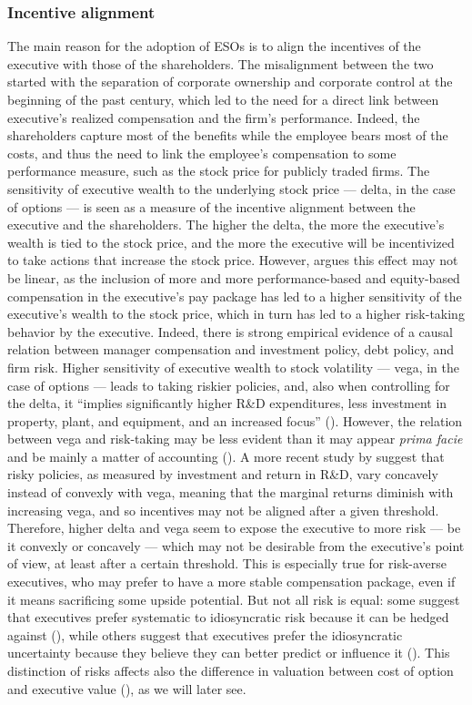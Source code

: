 \subsubsection{Incentive alignment} 
    The main reason for the adoption of ESOs is to align the incentives of the executive with those of the shareholders. The misalignment between the two started with the separation of corporate ownership and corporate control at the beginning of the past century, which led to the need for a direct link between executive's realized compensation and the firm's performance. Indeed, the shareholders capture most of the benefits while the employee bears most of the costs, and thus the need to link the employee's compensation to some performance measure, such as the stock price for publicly traded firms. 
    The sensitivity of executive wealth to the underlying stock price --- delta, in the case of options --- is seen as a measure of the incentive alignment between the executive and the shareholders. The higher the delta, the more the executive's wealth is tied to the stock price, and the more the executive will be incentivized to take actions that increase the stock price. However, \cite{coles2006managerial} argues this effect may not be linear, as the inclusion of more and more performance-based and equity-based compensation in the executive's pay package has led to a higher sensitivity of the executive's wealth to the stock price, which in turn has led to a higher risk-taking behavior by the executive. Indeed, there is strong empirical evidence of a causal relation between manager compensation and investment policy, debt policy, and firm risk. Higher sensitivity of executive wealth to stock volatility --- vega, in the case of options --- leads to taking riskier policies, and, also when controlling for the delta, it ``implies significantly higher R\&D expenditures, less investment in property, plant, and equipment, and an increased focus'' (\cite{coles2006managerial}). However, the relation between vega and risk-taking may be less evident than it may appear \textit{prima facie} and be mainly a matter of accounting (\cite{hayes2012stock}). A more recent study by \cite{billings2020can} suggest that risky policies, as measured by investment and return in R\&D, vary concavely instead of convexly with vega, meaning that the marginal returns diminish with increasing vega, and so incentives may not be aligned after a given threshold.
    Therefore, higher delta and vega seem to expose the executive to more risk --- be it convexly or concavely --- which may not be desirable from the executive's point of view, at least after a certain threshold. This is especially true for risk-averse executives, who may prefer to have a more stable compensation package, even if it means sacrificing some upside potential. But not all risk is equal: some suggest that executives prefer systematic to idiosyncratic risk because it can be hedged against (\cite{armstrong2012executive}), while others suggest that executives prefer the idiosyncratic uncertainty because they believe they can better predict or influence it (\cite{heron2017stock}). This distinction of risks affects also the difference in valuation between cost of option and executive value (\cite{meulbroek2001efficiency}), as we will later see.
